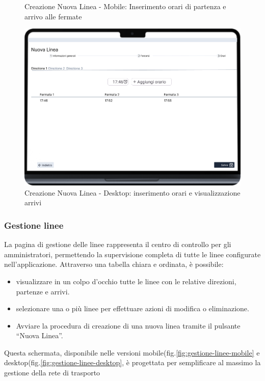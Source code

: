 \begin{figure}[H]
\begin{minipage}[b]{0.25\textwidth}
    \caption{Creazione Nuova Linea - Mobile: Inserimento orari di partenza e arrivo alle fermate}
    \label{fig:nuova-linea-step3-mobile}
  \end{minipage}
  \hfill
  \begin{minipage}[b]{0.68\textwidth}
    \centering
    \includegraphics[width=\textwidth]{images/mockup/Nuova Linea Step 3 Desktop.png}
    \caption{Creazione Nuova Linea - Desktop: inserimento orari e visualizzazione arrivi}
    \label{fig:nuova-linea-step3-desktop}
  \end{minipage}
\end{figure}

\subsubsection{Gestione linee}

La pagina di gestione delle linee rappresenta il centro di controllo per gli amministratori, permettendo la supervisione completa di tutte le linee configurate nell’applicazione. Attraverso una tabella chiara e ordinata, è possibile:
\begin{itemize}
    \item visualizzare in un colpo d’occhio tutte le linee con le relative direzioni, partenze e arrivi.
    \item selezionare una o più linee per effettuare azioni di modifica o eliminazione.
    \item Avviare la procedura di creazione di una nuova linea tramite il pulsante “Nuova Linea”.
\end{itemize}

Questa schermata, disponibile nelle versioni mobile(fig.\ref{fig:gestione-linee-mobile} e desktop(fig.\ref{fig:gestione-linee-desktop}, è progettata per semplificare al massimo la gestione della rete di trasporto

